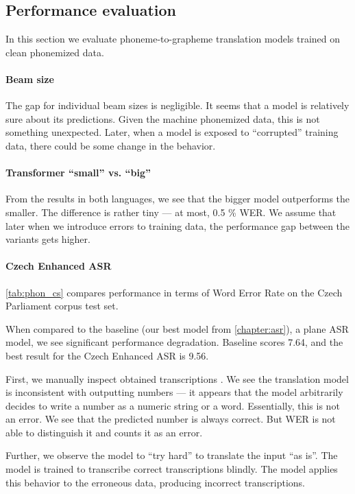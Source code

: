 \subsection{Performance evaluation}
In this section we evaluate phoneme-to-grapheme translation models trained on clean phonemized data.

\paragraph{Beam size} The gap for individual beam sizes is negligible. It seems that a model is relatively sure about its predictions. Given the machine phonemized data, this is not something unexpected. Later, when a model is exposed to ``corrupted'' training data, there could be some change in the behavior.

\paragraph{Transformer ``small'' vs. ``big''} From the results in both languages, we see that the bigger model outperforms the smaller. The difference is rather tiny --- at most, 0.5 \% WER. We assume that later when we introduce errors to training data, the performance gap between the variants gets higher.

\paragraph{Czech Enhanced ASR}
\cref{tab:phon_cs} compares performance in terms of Word Error Rate on the Czech Parliament corpus test set. 

When compared to the baseline (our best model from \cref{chapter:asr}), a plane ASR model, we see significant performance degradation. Baseline scores 7.64, and the best result for the Czech Enhanced ASR is 9.56. 

First, we manually inspect obtained transcriptions . We see the translation model is inconsistent with outputting numbers --- it appears that the model arbitrarily decides to write a number as a numeric string or a word. Essentially, this is not an error. We see that the predicted number is always correct. But WER is not able to distinguish it and counts it as an error.

Further, we observe the model to ``try hard'' to translate the input ``as is''. The model is trained to transcribe correct transcriptions blindly. The model applies this behavior to the erroneous data, producing incorrect transcriptions.    

